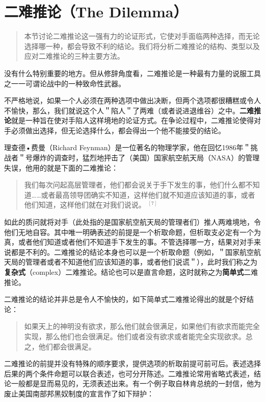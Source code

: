 \section{二难推论（The Dilemma）}

\begin{quotation}
本节讨论二难推论这一强有力的论证形式，它使对手面临两种选择，而无论选择哪一种，都会导致不利的结论。我们将分析二难推论的结构、类型以及应对二难推论的三种主要方法。
\end{quotation}

没有什么特别重要的地方。但从修辞角度看，二难推论是一种最有力量的说服工具之一一可谓论战中的一种致命性武器。

不严格地说，如果一个人必须在两种选项中做出决断，但两个选项都很糟糕或令人不愉快，那么，我们就说这个人＂陷人＂了两难（或者说进退维谷）之中。\textbf{二难推论}就是一种旨在使对手陷人这样境地的论证方式。在争论过程中，二难推论使得对手必须做出选择，但无论选择什么，都会得出一个他不能接受的结论。

理查德•费曼（Richard Feynman）是一位著名的物理学家，他在回忆1986年＂挑战者＂号爆炸的调查时，猛烈地抨击了（美国）国家航空航天局（NASA）的管理失误，他用的就是下面的二难推论：

\begin{quote}
我们每次问起高层管理者，他们都会说关于手下发生的事，他们什么都不知道……或者最高领导团确实不知道，这样他们就不知道应该知道的事，或者他们知道，这样他们就在对我们说说。 ${ }^{[7]}$
\end{quote}

如此的质问就将对手（此处指的是国家航空航天局的管理者们）推人两难境地，令他们无地自容。其中唯一明确表述的前提是一个析取命题，但析取支必定有一个为真，或者他们知道或者他们不知道手下发生的事。不管选择哪一方，结果对对手来说都是不利的。二难推论的结论本身也可以是一个析取命题（例如，＂国家航空航天局的管理者或者不知道他们应该知道的事，或者他们说谎＂），此时我们称之为\textbf{复杂式}（complex）二难推论。结论也可以是直言命题，这时就称之为\textbf{简单式}二难推论。

二难推论的结论并非总是令人不愉快的，如下简单式二难推论得出的就是个好结论：

\begin{quote}
如果天上的神明没有欲求，那么他们就会很满足，如果他们有欲求而能完全实现，那么他们也会很满足。他们或者没有欲求或者能完全实现欲求。总之，他们都会很满足。
\end{quote}

二难推论的前提并没有特殊的顺序要求，提供选项的析取前提可前可后。表述选择后果的两个条件命题可以联合表述，也可分开陈述。二难推论常用省略式表述，结论一般都是显而易见的，无须表述出来。有一个例子取自林肯总统的一封信，他为废止美国南部邦黑奴制度的宣言作了如下辩护：

